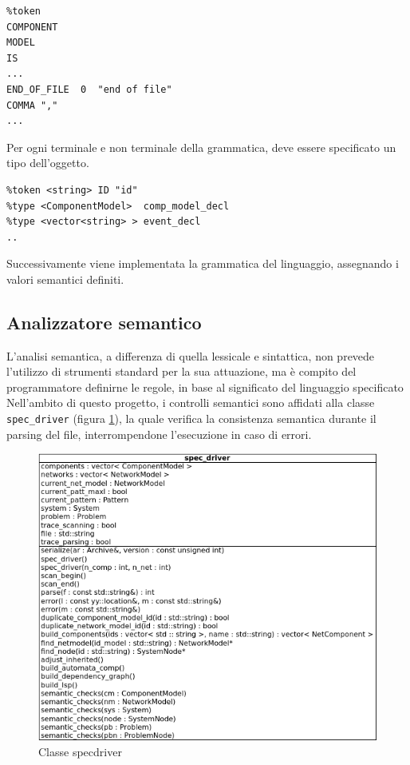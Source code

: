 \begin{verbatim}
%token
COMPONENT
MODEL
IS
...
END_OF_FILE  0  "end of file"
COMMA ","
...
\end{verbatim}

Per ogni terminale e non terminale della grammatica, deve essere specificato un tipo dell'oggetto.

\begin{verbatim}
%token <string> ID "id"
%type <ComponentModel>  comp_model_decl
%type <vector<string> > event_decl
..
\end{verbatim}

Successivamente viene implementata la grammatica del linguaggio, assegnando i valori semantici definiti.

\subsection{Analizzatore semantico}
L'analisi semantica, a differenza di quella lessicale e sintattica, non prevede l'utilizzo di strumenti standard per la sua attuazione, ma è compito del programmatore definirne le regole, in base al significato del linguaggio specificato Nell'ambito di questo progetto, i controlli semantici sono affidati alla classe \verb|spec_driver| (figura \ref{fig:driver}), la quale verifica la consistenza semantica durante il parsing del file, interrompendone l'esecuzione in caso di errori. 

\begin{figure}[htbp]
\centering
\includegraphics[scale=0.7]{./Img/implementazione/driver.png}
\caption{Classe specdriver}
\label{fig:driver}
\end{figure}

